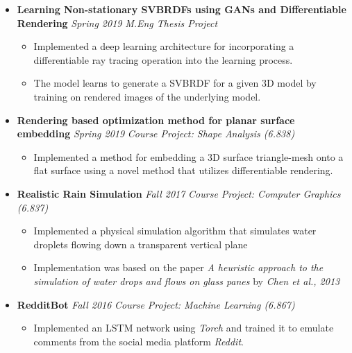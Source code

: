\documentclass[10pt]{article}
\begin{document}
\begin{itemize}
    \item
        \textbf{Learning Non-stationary SVBRDFs using GANs and Differentiable Rendering} \hfill \emph{Spring 2019} \linebreak
        \emph{M.Eng Thesis Project}
        \begin{itemize}
            \item Implemented a deep learning architecture for incorporating a differentiable ray tracing operation into the learning process.
            \item The model learns to generate a SVBRDF for a given 3D model by training on rendered images of the underlying model.
        \end{itemize}
    \item
        \textbf{Rendering based optimization method for planar surface embedding} \hfill \emph{Spring 2019} \linebreak
        \emph{Course Project: Shape Analysis (6.838)}
        \begin{itemize}
            \item Implemented a method for embedding a 3D surface triangle-mesh onto a flat surface using a novel method that utilizes differentiable rendering.
        \end{itemize}
    \item
        \textbf{Realistic Rain Simulation} \hfill \emph{Fall 2017} \linebreak
        \emph{Course Project: Computer Graphics (6.837)}
        \begin{itemize}
            \item Implemented a physical simulation algorithm that simulates water droplets flowing down a transparent vertical plane
            \item Implementation was based on the paper \emph{A heuristic approach to the simulation of water drops and flows on glass panes} by \emph{Chen et al., 2013} 
        \end{itemize}
    \item
        \textbf{RedditBot} \hfill \emph{Fall 2016} \linebreak
        \emph{Course Project: Machine Learning (6.867)}
        \begin{itemize}
            \item Implemented an LSTM network using \emph{Torch} and trained it to emulate comments from the social media platform \emph{Reddit}.
        \end{itemize}
\end{itemize}
\end{document}

